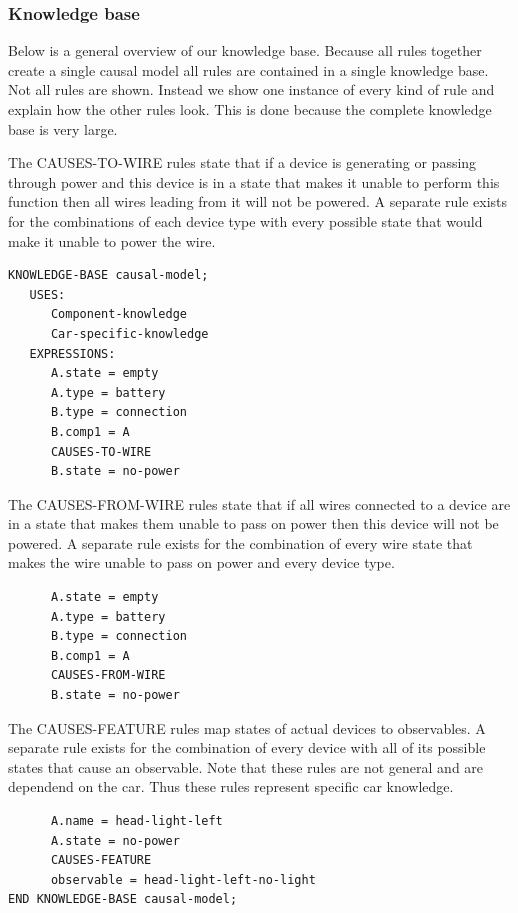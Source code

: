 \subsubsection{Knowledge base}
Below is a general overview of our knowledge base. Because all rules together create a single causal model all rules are contained in a single knowledge base. Not all rules are shown. Instead we show one instance of every kind of rule and explain how the other rules look. This is done because the complete knowledge base is very large.

The CAUSES-TO-WIRE rules state that if a device is generating or passing through power and this device is in a state that makes it unable to perform this function then all wires leading from it will not be powered. A separate rule exists for the combinations of each device type with every possible state that would make it unable to power the wire.

\begin{verbatim}
KNOWLEDGE-BASE causal-model;
   USES:
      Component-knowledge
      Car-specific-knowledge
   EXPRESSIONS:
      A.state = empty
      A.type = battery
      B.type = connection
      B.comp1 = A
      CAUSES-TO-WIRE
      B.state = no-power
\end{verbatim}

\noindent
The CAUSES-FROM-WIRE rules state that if all wires connected to a device are in a state that makes them unable to pass on power then this device will not be powered. A separate rule exists for the combination of every wire state that makes the wire unable to pass on power and every device type.

\begin{verbatim}
      A.state = empty
      A.type = battery
      B.type = connection
      B.comp1 = A
      CAUSES-FROM-WIRE
      B.state = no-power
\end{verbatim}

\noindent
The CAUSES-FEATURE rules map states of actual devices to observables. A separate rule exists for the combination of every device with all of its possible states that cause an observable. Note that these rules are not general and are dependend on the car. Thus these rules represent specific car knowledge.

\begin{verbatim}
      A.name = head-light-left
      A.state = no-power
      CAUSES-FEATURE
      observable = head-light-left-no-light
END KNOWLEDGE-BASE causal-model;
\end{verbatim}


